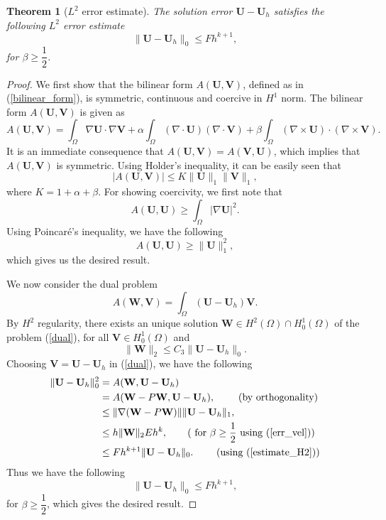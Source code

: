 \documentclass[11pt]{article}
\newtheorem{theorem}{Theorem}[section]
\begin{document}
\begin{theorem}[$L^2$ error estimate]
The solution error $\textbf{U}-\textbf{U}_h$ satisfies the following $L^2$ error estimate 
$$
\|\textbf{U}-\textbf{U}_h\|_0 \leq F h^{k+1},
$$
for $\beta \geq \dfrac{1}{2}$.
\end{theorem}
\begin{proof}
We first show that the bilinear form $A(\textbf{U},\textbf{V})$, defined as in (\ref{bilinear_form}), is symmetric, continuous and coercive in $H^1$ norm. The bilinear form $A(\textbf{U},\textbf{V})$ is given as 
$$
A(\textbf{U},\textbf{V})=\int_\Omega\nabla\textbf{U}\cdot\nabla\textbf{V}
+\alpha\int_\Omega(\nabla\cdot\textbf{U})(\nabla\cdot\textbf{V}) +\beta\int_\Omega(\nabla\times\textbf{U})
\cdot(\nabla\times\textbf{V}).
$$
It is an immediate consequence that $A(\textbf{U},\textbf{V})=A(\textbf{V},\textbf{U})$, which implies that $A(\textbf{U},\textbf{V})$ is symmetric. Using Holder's inequality, it can be easily seen that 
$$
|A(\textbf{U},\textbf{V})| \leq K \|\textbf{U}\|_1\|\textbf{V}\|_1,
$$
where $K=1+\alpha+\beta$. For showing coercivity, we first note that
$$
A(\textbf{U},\textbf{U}) \geq \int_\Omega|\nabla\textbf{U}|^2.
$$
Using Poincar\'{e}'s inequality, we have the following
$$
A(\textbf{U},\textbf{U}) \geq \|\textbf{U}\|_1^2,
$$
which gives us the desired result.

 We now consider the dual problem 
\begin{equation}\label{dual}
A(\textbf{W},\textbf{V}) = \int_\Omega (\textbf{U}-\textbf{U}_h)\textbf{V}.
\end{equation}
By $H^2$ regularity, there exists an unique solution $\textbf{W}\in H^2(\Omega)\cap H^1_0(\Omega)$ of the problem (\ref{dual}), for all $\textbf{V}\in H^1_0(\Omega)$ and 
\begin{equation}\label{estimate_H2}
\|\textbf{W}\|_2 \leq C_3 \|\textbf{U}-\textbf{U}_h\|_0.
\end{equation}
Choosing $\textbf{V}= \textbf{U}-\textbf{U}_h$ in (\ref{dual}), we have the following
\begin{equation}
\begin{aligned}
\|\textbf{U}-\textbf{U}_h\|_0^2 &= A(\textbf{W},\textbf{U}-\textbf{U}_h)\\
&= A(\textbf{W}-P\textbf{W},\textbf{U}-\textbf{U}_h), \qquad \mbox{ (by orthogonality)}\\
&\leq \|\nabla (\textbf{W}-P \textbf{W})\|\|\textbf{U}-\textbf{U}_h\|_1,\\
&\leq h\|\textbf{W}\|_2 E h^k , \qquad (\mbox{ for } \beta \geq \dfrac{1}{2} \mbox{ using } (\ref{err_vel}))\\
&\leq F h^{k+1} \|\textbf{U}-\textbf{U}_h\|_0. \qquad \mbox{ (using (\ref{estimate_H2}))}
\end{aligned}
\end{equation}
Thus we have the following 
\begin{equation}\label{err_vel_L2}
\|\textbf{U}-\textbf{U}_h\|_0 \leq F h^{k+1},
\end{equation}
for $\beta \geq \dfrac{1}{2}$, which gives the desired result.
\end{proof}
\end{document}
